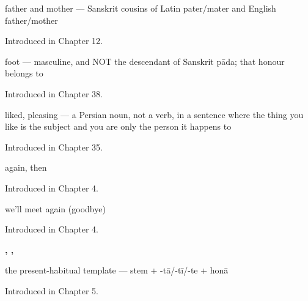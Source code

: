 \noindent\begin{minipage}[t]{\linewidth}
\raggedright
\textbf{ }\par
\small father and mother — Sanskrit cousins of Latin pater/mater and English father/mother\par
\footnotesize Introduced in Chapter 12.
\end{minipage}\par\medskip

\noindent\begin{minipage}[t]{\linewidth}
\raggedright
\textbf{}\par
\small foot — masculine, and NOT the descendant of Sanskrit pāda; that honour belongs to \par
\footnotesize Introduced in Chapter 38.
\end{minipage}\par\medskip

\noindent\begin{minipage}[t]{\linewidth}
\raggedright
\textbf{}\par
\small liked, pleasing — a Persian noun, not a verb, in a sentence where the thing you like is the subject and you are only the person it happens to\par
\footnotesize Introduced in Chapter 35.
\end{minipage}\par\medskip

\noindent\begin{minipage}[t]{\linewidth}
\raggedright
\textbf{}\par
\small again, then\par
\footnotesize Introduced in Chapter 4.
\end{minipage}\par\medskip

\noindent\begin{minipage}[t]{\linewidth}
\raggedright
\textbf{ }\par
\small we'll meet again (goodbye)\par
\footnotesize Introduced in Chapter 4.
\end{minipage}\par\medskip

\noindent\begin{minipage}[t]{\linewidth}
\raggedright
\textbf{ ,  ,  }\par
\small the present-habitual template — stem + -tā/-tī/-te + honā\par
\footnotesize Introduced in Chapter 5.
\end{minipage}\par\medskip

